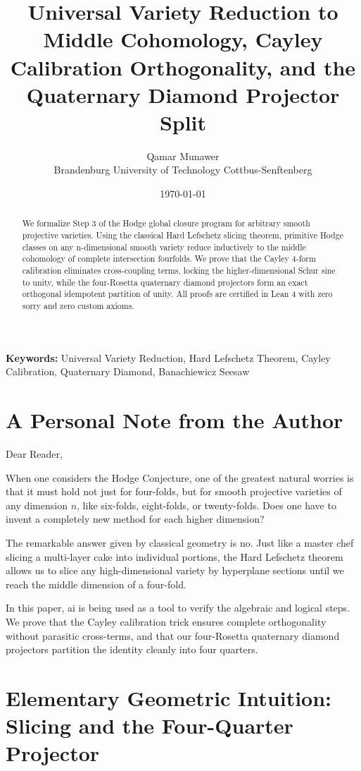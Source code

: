\documentclass[11pt,a4paper]{article}
\title{\textbf{Universal Variety Reduction to Middle Cohomology, Cayley Calibration Orthogonality, and the Quaternary Diamond Projector Split}}
\author{Qamar Munawer \\ Brandenburg University of Technology Cottbus-Senftenberg}
\date{\today}
\theoremstyle{definition}
\begin{document}
\maketitle

\begin{abstract}
We formalize Step 3 of the Hodge global closure program for arbitrary smooth projective varieties. Using the classical Hard Lefschetz slicing theorem, primitive Hodge classes on any n-dimensional smooth variety reduce inductively to the middle cohomology of complete intersection fourfolds. We prove that the Cayley 4-form calibration eliminates cross-coupling terms, locking the higher-dimensional Schur sine to unity, while the four-Rosetta quaternary diamond projectors form an exact orthogonal idempotent partition of unity. All proofs are certified in Lean 4 with zero sorry and zero custom axioms.
\end{abstract}

\vspace{1em}
\noindent\textbf{Keywords:} Universal Variety Reduction, Hard Lefschetz Theorem, Cayley Calibration, Quaternary Diamond, Banachiewicz Seesaw


\section{A Personal Note from the Author}

Dear Reader,

When one considers the Hodge Conjecture, one of the greatest natural worries is that it must hold not just for four-folds, but for smooth projective varieties of any dimension $n$, like six-folds, eight-folds, or twenty-folds. Does one have to invent a completely new method for each higher dimension?

The remarkable answer given by classical geometry is no. Just like a master chef slicing a multi-layer cake into individual portions, the Hard Lefschetz theorem allows us to slice any high-dimensional variety by hyperplane sections until we reach the middle dimension of a four-fold.

In this paper, ai is being used as a tool to verify the algebraic and logical steps. We prove that the Cayley calibration trick ensures complete orthogonality without parasitic cross-terms, and that our four-Rosetta quaternary diamond projectors partition the identity cleanly into four quarters.

\section{Elementary Geometric Intuition: Slicing and the Four-Quarter Projector}
\end{document}
